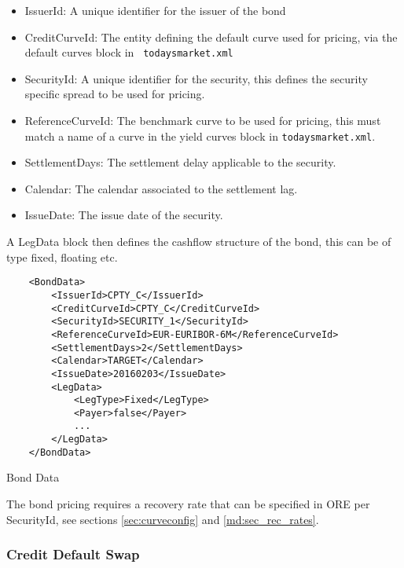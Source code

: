 \begin{itemize}
\item IssuerId: A unique identifier for the issuer of the bond
\item CreditCurveId: The entity defining the default curve used for pricing, via the default curves block in {\tt
    todaysmarket.xml}
\item SecurityId: A unique identifier for the security, this defines the security specific spread to be used for
  pricing.
\item ReferenceCurveId: The benchmark curve to be used for pricing, this must match a name of a curve in the yield
  curves block in {\tt todaysmarket.xml}.
\item SettlementDays: The settlement delay applicable to the security.
\item Calendar: The calendar associated to the settlement lag.
\item IssueDate: The issue date of the security.
\end{itemize}

A LegData block then defines the cashflow structure of the bond, this can be of type fixed, floating etc.

\begin{listing}[H]
\begin{verbatim}
    <BondData>
        <IssuerId>CPTY_C</IssuerId>
        <CreditCurveId>CPTY_C</CreditCurveId>
        <SecurityId>SECURITY_1</SecurityId>
        <ReferenceCurveId>EUR-EURIBOR-6M</ReferenceCurveId>
        <SettlementDays>2</SettlementDays>
        <Calendar>TARGET</Calendar>
        <IssueDate>20160203</IssueDate>
        <LegData>
            <LegType>Fixed</LegType>
            <Payer>false</Payer>
            ...
        </LegData>
    </BondData>
\end{verbatim}
\caption{Bond Data}
\label{lst:bonddata}
\end{listing}

The bond pricing requires a recovery rate that can be specified in ORE per SecurityId, see sections \ref{sec:curveconfig} and \ref{md:sec_rec_rates}. 

\subsubsection{Credit Default Swap}

